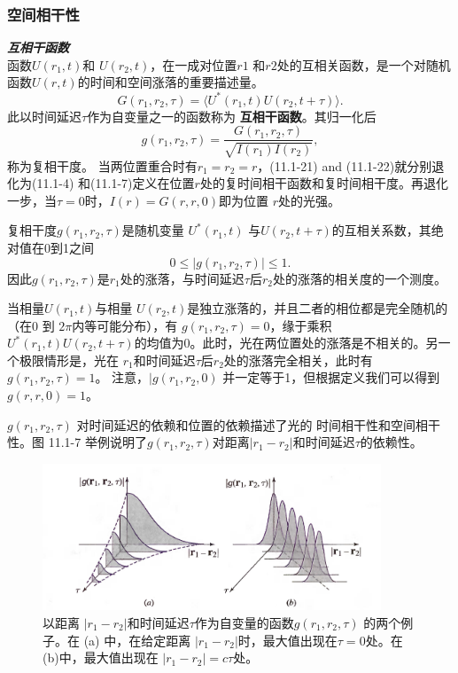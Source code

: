 \documentclass[UTF8]{ctexart}
\numberwithin{figure}{subsection}
\numberwithin{table}{subsection}
\begin{document}
\subsubsection{空间相干性}
\endgroup
\noindent\textcolor{ksc}{\textbf{\textsl{互相干函数}}}\\
函数$ U(r_1,t) $和 $U(r_2,t) $，在一成对位置$ r1 $ 和$ r2 $处的互相关函数，是一个对随机函数$ U(r,t) $的时间和空间涨落的重要描述量。
\begin{equation}
G(r_1, r_2, \tau) = \langle U^\ast (r_1, t) U(r_2, t + \tau) \rangle .
\end{equation}
此以时间延迟$\tau$作为自变量之一的函数称为 \textbf{互相干函数}。其归一化后
\begin{equation}
g(r_1, r_2, \tau) = \frac{G(r_1, r_2, \tau)}{\sqrt{I(r_1) I(r_2)}},
\end{equation} 
称为复相干度。 当两位置重合时有$ r_1 = r_2 = r $，(11.1-21) and (11.1-22)就分别退化为(11.1-4) 和(11.1-7)定义在位置$ r $处的复时间相干函数和复时间相干度。再退化一步，当$ \tau = 0 $时，$ I(r) = G(r, r, 0) $即为位置 $ r $处的光强。
\par 复相干度$ g(r_1, r_2, \tau) $是随机变量 $ U^\ast (r_1, t) $ 与$ U(r_2, t + \tau) $的互相关系数，其绝对值在0到1之间
\begin{equation}
0 \leq \lvert g(r_1, r_2, \tau) \rvert \leq 1 .
\end{equation}
因此$ g(r_1, r_2, \tau) $是$ r_1 $处的涨落，与时间延迟$ \tau $后$ r_2 $处的涨落的相关度的一个测度。
\par 当相量$ U(r_1, t) $与相量 $ U(r_2, t) $是独立涨落的，并且二者的相位都是完全随机的（在0 到 $ 2\pi $内等可能分布），有 $ g(r_1, r_2, \tau) = 0 $，缘于乘积$ U^\ast (r_1, t) U(r_2, t + \tau) $的均值为0。此时，光在两位置处的涨落是不相关的。另一个极限情形是，光在 $ r_1 $和时间延迟$ \tau $后$ r_2 $处的涨落完全相关，此时有 $ g(r_1, r_2, \tau) = 1 $。 注意，$ \lvert g(r_1, r_2, 0) $ 并一定等于1，但根据定义我们可以得到$ g(r, r, 0) = 1 $。
\par $ g(r_1, r_2, \tau) $ 对时间延迟的依赖和位置的依赖描述了光的 时间相干性和空间相干性。图 11.1-7 举例说明了$ g(r_1, r_2, \tau) $对距离$ \lvert r_1 - r_2 \rvert $和时间延迟$ \tau $的依赖性。
\begin{figure}[H]
\centering
\includegraphics[width=0.9\textwidth]{11_1_7.PNG}
\caption{以距离 $ \lvert r_1 - r_2 \rvert $和时间延迟$ \tau $作为自变量的函数$ g(r_1, r_2, \tau) $ 的两个例子。在 (a) 中，在给定距离 $ \lvert r_1 - r_2 \rvert $时，最大值出现在$ \tau = 0 $处。在(b)中，最大值出现在 $ \lvert r_1 - r_2 \rvert = c \tau $处。}
\label{fig: 11_1_7}
\end{figure}
\end{document}
